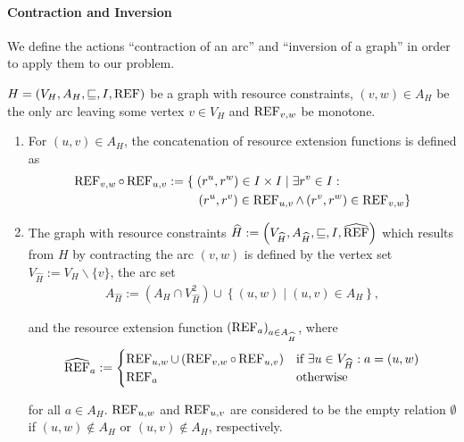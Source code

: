 \paragraph{Contraction and Inversion} \parfill

We define the actions \enquote{contraction of an arc} and \enquote{inversion of a graph} in order to apply them to our problem.

\begin{definition}[Contraction]
\label{def:contraction}

${H=\left(V_H,A_H,\sqsubseteq,I,\operatorname{REF}\right)}$ be a graph with resource constraints, ${(v,w)\in A_H}$ be the only arc leaving some vertex $v\in V_H$ and $\operatorname{REF}_{v,w}$ be monotone.
\begin{enumerate}
	\item
For $(u,v)\in A_H$, the concatenation of resource extension functions is defined as
\begin{align*}
	\REF_{v,w}\circ\REF_{u,v} := \left\{\vphantom{\REF_{v,w}}\right. & \left(r^u,r^w\right)\in I\times I\mid \exists r^v\in I: \\
	& \left.\left(r^u,r^v\right)\in\REF_{u,v}\land\left(r^v,r^w\right)\in\REF_{v,w}\right\}
\end{align*}
	\item
The graph with resource constraints ${\widehat{H} := \left(V_{\widehat{H}},A_{\widehat{H}},\sqsubseteq,I,\widehat{\operatorname{REF}}\right)}$ which results from $H$ by contracting the arc $(v,w)$ is defined by the vertex set ${V_{\widehat{H}} := V_H\backslash\{v\}}$, the arc set
\begin{align*}
	A_{\widehat{H}} := \left(A_H\cap V^2_{\widehat{H}}\right) \cup \left\{(u,w)\mid (u,v)\in A_H\right\},
\end{align*}

and the resource extension function ${\left(\operatorname{REF}_a\right)_{a\in A_{\widehat{H}}}}$, where
\begin{align*}
	\widehat{\operatorname{REF}}_a :=
	\begin{cases}
		\operatorname{REF}_{u,w}\cup\left(\operatorname{REF}_{v,w}\circ\operatorname{REF}_{u,v}\right) & \text{if } \exists u\in V_{\widehat{H}}: a=(u,w) \\
		\operatorname{REF}_a & \text{otherwise}
	\end{cases}
\end{align*}

for all ${a\in A_H}$. $\operatorname{REF}_{u,w}$ and $\operatorname{REF}_{u,v}$ are considered to be the empty relation $\emptyset$ if ${(u,w)\notin A_H}$ or ${(u,v)\notin A_H}$, respectively.

\end{enumerate}

\end{definition}

